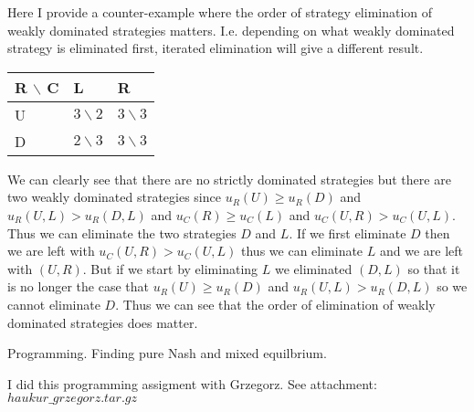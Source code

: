 \documentclass[12pt]{article}
\newenvironment{question}[2][Question]{\begin{trivlist}
\item[\hskip \labelsep {\bfseries #1}\hskip \labelsep {\bfseries #2.}]}{\end{trivlist}}
\newenvironment{answer}[2][Answer]{\begin{trivlist}
\item[\hskip \labelsep {\bfseries #1}\hskip \labelsep {\bfseries #2:}]}{\end{trivlist}}
\begin{document}
\begin{answer}{a)}
Here I provide a counter-example where the order of strategy elimination of weakly dominated strategies matters. I.e. depending on what weakly dominated strategy is eliminated first, iterated elimination will give a different result.

\begin{table}[h]
    \begin{tabular}{|l|l|l|}
    \hline
    R $\backslash$ C & L            & R              \\ \hline
    U & $3\backslash 2$ & $3\backslash 3$   \\ \hline
    D & $2\backslash 3$ & $3\backslash 3$ \\ \hline
    \end{tabular}
\end{table}

We can clearly see that there are no strictly dominated strategies but there are two weakly dominated strategies since $u_R(U) \geq u_R(D)$ and $u_R(U,L) > u_R(D,L)$ and $u_C(R) \geq u_C(L)$ and $u_C(U,R) > u_C(U,L)$. Thus we can eliminate the two strategies $D$ and $L$. If we first eliminate $D$ then we are left with $u_C(U,R) > u_C(U,L)$ thus we can eliminate $L$ and we are left with $(U,R)$. But if we start by eliminating $L$ we eliminated $(D,L)$ so that it is no longer the case that $u_R(U) \geq u_R(D)$ and $u_R(U,L) > u_R(D,L)$ so we cannot eliminate $D$. Thus we can see that the order of elimination of weakly dominated strategies does matter.

\end{answer}

\begin{question}{4}
Programming. Finding pure Nash and mixed equilbrium.
\end{question}
\begin{answer}{a)}
I did this programming assigment with Grzegorz.
See attachment: $haukur\_grzegorz.tar.gz$
\end{answer}
\end{document}
